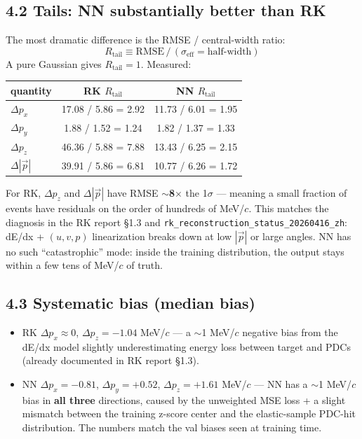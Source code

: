 \documentclass[a4paper,11pt]{article}
\begin{document}
\subsection{4.2 Tails: NN substantially better than RK}

The most dramatic difference is the RMSE / central-width ratio:
\[
    R_\text{tail} \equiv \text{RMSE}\,/\,(\sigma_\text{eff}=\text{half-width})
\]
A pure Gaussian gives $R_\text{tail} = 1$. Measured:
\begin{table}[H]
\centering\footnotesize
\begin{tabular}{lcc}
\toprule
quantity    & RK $R_\text{tail}$ & NN $R_\text{tail}$ \\
\midrule
$\Delta p_x$    & 17.08 / 5.86 = 2.92 & 11.73 / 6.01 = 1.95 \\
$\Delta p_y$    &  1.88 / 1.52 = 1.24 &  1.82 / 1.37 = 1.33 \\
$\Delta p_z$    & 46.36 / 5.88 = 7.88 & 13.43 / 6.25 = 2.15 \\
$\Delta|\vec p|$& 39.91 / 5.86 = 6.81 & 10.77 / 6.26 = 1.72 \\
\bottomrule
\end{tabular}
\end{table}

For RK, $\Delta p_z$ and $\Delta|\vec p|$ have RMSE $\sim$\textbf{8$\times$} the 1$\sigma$ --- meaning a small fraction of events have residuals on the order of hundreds of MeV/$c$.
This matches the diagnosis in the RK report \S1.3 and \texttt{rk\_reconstruction\_status\_20260416\_zh}: dE/dx + $(u, v, p)$ linearization breaks down at low $|\vec p|$ or large angles.
NN has no such ``catastrophic'' mode: inside the training distribution, the output stays within a few tens of MeV/$c$ of truth.

\subsection{4.3 Systematic bias (median bias)}

\begin{itemize}[nosep]
    \item RK $\Delta p_x \approx 0$, $\Delta p_z = -1.04$ MeV/$c$ --- a $\sim$1 MeV/$c$ negative bias from the dE/dx model slightly underestimating energy loss between target and PDCs (already documented in RK report \S1.3).
    \item NN $\Delta p_x = -0.81$, $\Delta p_y = +0.52$, $\Delta p_z = +1.61$ MeV/$c$ --- NN has a $\sim$1 MeV/$c$ bias in \textbf{all three} directions, caused by the unweighted MSE loss + a slight mismatch between the training z-score center and the elastic-sample PDC-hit distribution. The numbers match the val biases seen at training time.
\end{itemize}
\end{document}
